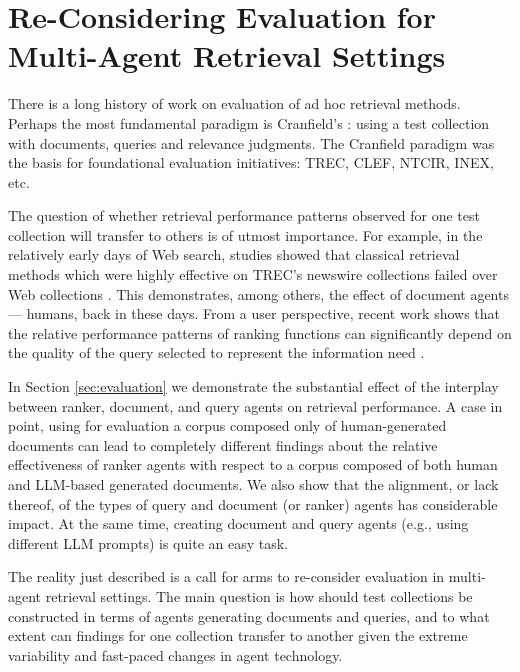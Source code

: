\section{Re-Considering Evaluation for Multi-Agent Retrieval Settings}
\label{sec:evalConsider}
There is a long history of work on evaluation of ad hoc retrieval methods. Perhaps the most fundamental paradigm is Cranfield's \cite{cranfield}: using a test collection with documents, queries and relevance judgments. The Cranfield paradigm was the basis for foundational evaluation initiatives: TREC, CLEF, NTCIR, INEX, etc. 

The question of whether retrieval performance patterns observed for one test collection will transfer to others is of utmost importance. For example, in the relatively early days of Web search, studies showed that classical retrieval methods which were highly effective on TREC's newswire collections failed over Web collections \cite{Singhal+Kaszkiel:01a}. This demonstrates, among others, the effect of document agents --- humans, back in these days. From a user perspective, recent work shows that the relative performance patterns of ranking functions can significantly depend on the quality of the query selected to represent the information need \cite{shane:22a,Rashidi+al:24a}. 

In Section \ref{sec:evaluation} we demonstrate the substantial effect of the interplay between ranker, document, and query agents on retrieval performance. A case in point, using for evaluation a corpus composed only of human-generated documents can lead to completely different findings about the relative effectiveness of ranker agents with respect to a corpus composed of both human and LLM-based generated documents. We also show that the alignment, or lack thereof, of the types of query and document (or ranker) agents has considerable impact. At the same time, creating document and query agents (e.g., using different LLM prompts) is quite an easy task. 

The reality just described is a call for arms to re-consider evaluation in multi-agent retrieval settings. The main question is how should test collections be constructed in terms of agents generating documents and queries, and to what extent can findings for one collection transfer to another given the extreme variability and fast-paced changes in agent technology. 

